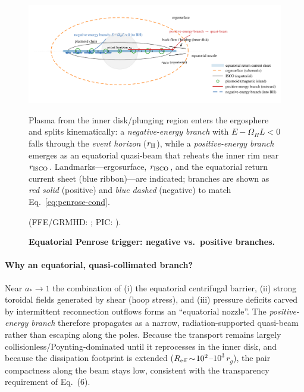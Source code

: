 \documentclass[twocolumn]{aastex701}
\begin{document}
\begin{figure}[p!]
  \centering
  \includegraphics[width=\textwidth]{fig_equatorial_trigger_schematic.pdf}
  \caption{\textbf{Equatorial Penrose trigger: negative vs.\ positive branches.}}
  Plasma from the inner disk/plunging region enters the ergosphere and splits kinematically:
  a \emph{negative-energy branch} with $E-\Omega_H L<0$ falls through the \emph{event horizon} ($r_{\rm H}$),
  while a \emph{positive-energy branch} emerges as an equatorial quasi-beam that reheats the inner rim near $r_{\rm ISCO}$.
  Landmarks—ergosurface, $r_{\rm ISCO}$, and the equatorial return current sheet (blue ribbon)—are indicated; branches are shown as \emph{red solid} (positive) and \emph{blue dashed} (negative) to match Eq.~\eqref{eq:penrose-cond}.
  
  {\footnotesize(FFE/GRMHD: \citealt{Komissarov2004MNRAS,EastYang2018PRD,Pan2018PRD};
                 PIC: \citealt{Parfrey2019PRL,Bransgrove2021PRL}).}
  \label{fig:equatorial_trigger}
\end{figure}
\FloatBarrier

\paragraph{Why an equatorial, quasi-collimated branch?}
Near $a_*\!\to\!1$ the combination of (i) the equatorial centrifugal barrier,
(ii) strong toroidal fields generated by shear (hoop stress), and
(iii) pressure deficits carved by intermittent reconnection outflows
forms an ``equatorial nozzle''. The \emph{positive-energy branch} therefore propagates as a
narrow, radiation-supported quasi-beam rather than escaping along the poles.
Because the transport remains largely collisionless/Poynting-dominated until
it reprocesses in the inner disk, and because the dissipation footprint is
extended ($R_{\rm eff}\!\sim\!10^{2}$–$10^{3}\,r_g$), the pair compactness
along the beam stays low, consistent with the transparency requirement of Eq.~(6).
\end{document}

